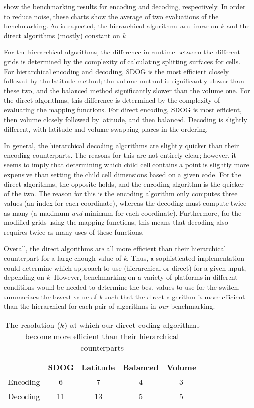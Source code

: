  show the benchmarking results for encoding and decoding, respectively.
In order to reduce noise, these charts show the average of two evaluations of the benchmarking.
As is expected, the hierarchical algorithms are linear on $k$ and the direct algorithms (mostly) constant on $k$.


For the hierarchical algorithms, the difference in runtime between the different grids is determined by the complexity of calculating splitting surfaces for cells.
For hierarchical encoding and decoding, SDOG is the most efficient closely followed by the latitude method; the volume method is significantly slower than these two, and the balanced method significantly slower than the volume one.
For the direct algorithms, this difference is determined by the complexity of evaluating the mapping functions.
For direct encoding, SDOG is most efficient, then volume closely followed by latitude, and then balanced.
Decoding is slightly different, with latitude and volume swapping places in the ordering.


In general, the hierarchical decoding algorithms are slightly quicker than their encoding counterparts.
The reasons for this are not entirely clear; however, it seems to imply that determining which child cell contains a point is slightly more expensive than setting the child cell dimensions based on a given code.
For the direct algorithms, the opposite holds, and the encoding algorithm is the quicker of the two.
The reason for this is the encoding algorithm only computes three values (an index for each coordinate), whereas the decoding must compute twice as many (a maximum \textit{and} minimum for each coordinate).
Furthermore, for the modified grids using the mapping functions, this means that decoding also requires twice as many uses of these functions.


Overall, the direct algorithms are all more efficient than their hierarchical counterpart for a large enough value of $k$.
Thus, a sophisticated implementation could determine which approach to use (hierarchical or direct) for a given input, depending on $k$.
However, benchmarking on a variety of platforms in different conditions would be needed to determine the best values to use for the switch.
 summarizes the lowest value of $k$ such that the direct algorithm is more efficient than the hierarchical for each pair of algorithms in \textit{our} benchmarking.


\begin{table}[htp!]
	\centering
	\caption[Resolution at which direct coding becomes more efficient than hierarchical]{
		The resolution ($k$) at which our direct coding algorithms become more efficient than their hierarchical counterparts
	}
	\begin{tabular}{@{} c c c c c @{}}
		\toprule
		& SDOG & Latitude & Balanced & Volume \\ \midrule
		Encoding & 6    & 7        & 4        & 3      \\
		Decoding & 11   & 13       & 5        & 5      \\ \bottomrule
	\end{tabular}
	\label{tab:hierarch-vs-direct}
\end{table}


